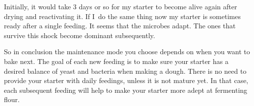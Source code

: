 Initially, it would take 3 days or so for my starter to become alive again
after drying and reactivating it. If I~do the same thing now my starter is
sometimes ready after a single feeding. It seems that the microbes adapt. The ones
that survive this shock become dominant subsequently.

So in conclusion the maintenance mode you choose depends on when you want to bake next.
The goal of each new feeding is to make sure your starter
has a desired balance of yeast and bacteria when making a dough. There is no need to provide your
starter with daily feedings, unless it is not mature yet. In that case, each
subsequent feeding will help to make your starter more adept at fermenting
flour.

